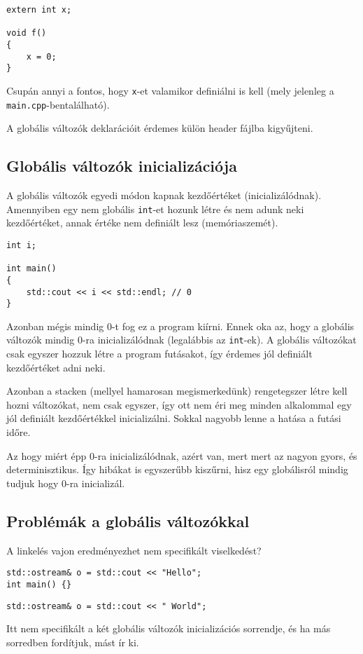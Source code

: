 \documentclass[a4paper,11.5pt]{article}
\begin{document}
	\begin{lstlisting}
extern int x;

void f() 
{
	x = 0;
}
	\end{lstlisting}
	Csupán annyi a fontos, hogy \texttt{x}-et valamikor definiálni is kell (mely jelenleg a \texttt{main.cpp}-bentalálható).
	\begin{note}
		A globális változók deklarációit érdemes külön header fájlba kigyűjteni.
	\end{note}
	\subsection{Globális változók inicializációja}
	A globális változók egyedi módon kapnak kezdőértéket (inicializálódnak). Amennyiben egy nem globális \texttt{int}-et hozunk létre és nem adunk neki kezdőértéket, annak értéke nem definiált lesz (memóriaszemét).
	\begin{lstlisting}
int i;

int main() 
{
	std::cout << i << std::endl; // 0
}
	\end{lstlisting}   
	Azonban mégis mindig 0-t fog ez a program kiírni. Ennek oka az, hogy a globális változók mindig 0-ra inicializálódnak (legalábbis az \texttt{int}-ek). A globális változókat csak egyszer hozzuk létre a program futásakot, így érdemes jól definiált kezdőértéket adni neki.
	
	Azonban a stacken (mellyel hamarosan megismerkedünk) rengetegszer létre kell hozni változókat, nem csak egyszer, így ott nem éri meg minden alkalommal egy jól definiált kezdőértékkel inicializálni. Sokkal nagyobb lenne a hatása a futási időre.
	
	Az hogy miért épp 0-ra inicializálódnak, azért van, mert mert az nagyon gyors, és determinisztikus. Így hibákat is egyszerűbb kiszűrni, hisz egy globálisról mindig tudjuk hogy 0-ra inicializál.
	\subsection{Problémák a globális változókkal}
	
	A linkelés vajon eredményezhet nem specifikált viselkedést?
	\bigskip
	
	\begin{lstlisting}
std::ostream& o = std::cout << "Hello";
int main() {}
	\end{lstlisting}
	\bigskip
	
	\begin{lstlisting}
std::ostream& o = std::cout << " World";
	\end{lstlisting}
	Itt nem specifikált a két globális változók inicializációs sorrendje, és ha más sorredben fordítjuk, mást ír ki.
	
\end{document}
